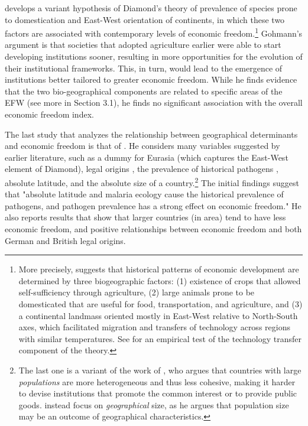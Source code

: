 \documentclass[a4paper,12pt]{article}
\begin{document}
\cite{gohmann2018persistence} develops a variant hypothesis of Diamond's \citeyearpar{diamond1997guns} theory of prevalence of species prone to domestication and East-West orientation of continents, in which these two factors are associated with contemporary levels of economic freedom.\footnote{More precisely, \cite{diamond1997guns} suggests that historical patterns of economic development are determined by three biogeographic factors: (1) existence of crops that allowed self-sufficiency through agriculture, (2) large animals prone to be domesticated that are useful for food, transportation, and agriculture, and (3) a continental landmass oriented mostly in East-West relative to North-South axes, which facilitated migration and transfers of technology across regions with similar temperatures. See \cite{pavlik2019did} for an empirical test of the technology transfer component of the theory.} Gohmann's argument is that societies that adopted agriculture earlier were able to start developing institutions sooner, resulting in more opportunities for the evolution of their institutional frameworks. This, in turn, would lead to the emergence of institutions better tailored to greater economic freedom. While he finds evidence that the two bio-geographical components are related to specific areas of the EFW (see more in Section 3.1), he finds no significant association with the overall economic freedom index.

The last study that analyzes the relationship between geographical determinants and economic freedom is that of \cite{Murphy2021}. He considers many variables suggested by earlier literature, such as a dummy for Eurasia (which captures the East-West element of Diamond), legal origins \citep{nattinger2012legal}, the prevalence of historical pathogens \citep{nikolaev2017historical}, absolute latitude, and  the absolute size of a country.\footnote{The last one is a variant of the work of \cite{alesina2003size}, who argues that countries with large \textit{populations} are more heterogeneous and thus less cohesive, making it harder to devise institutions that promote the common interest or to provide public goods. \cite{Murphy2021} instead focus on \textit{geographical} size, as he argues that population size may be an outcome of geographical characteristics.} The initial findings suggest that "absolute latitude and malaria ecology cause the historical prevalence of pathogens, and pathogen prevalence has a strong effect on economic freedom." He also reports results that show that larger countries (in area) tend to have less economic freedom, and positive relationships between economic freedom and both German and British legal origins. 
\end{document}
